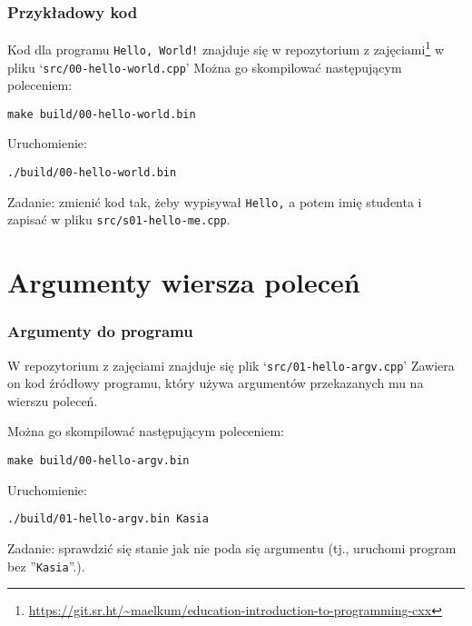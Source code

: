 \documentclass[aspectratio=169]{beamer}
\begin{document}
\begin{frame}
    \frametitle{Przykładowy kod}

    Kod dla programu {\tt Hello, World!} znajduje się w repozytorium z
    zajęciami\footnote{\url{https://git.sr.ht/~maelkum/education-introduction-to-programming-cxx}}
    w pliku `{\tt src/00-hello-world.cpp}'
    Można go skompilować następującym poleceniem:

    \vspace{1em}
    {\tt make build/00-hello-world.bin}
    \vspace{1em}

    Uruchomienie:

    \vspace{1em}
    {\tt ./build/00-hello-world.bin}
    \vspace{1em}

    Zadanie: zmienić kod tak, żeby wypisywał {\tt Hello,} a potem imię studenta
    i zapisać w pliku {\tt src/s01-hello-me.cpp}.
    \label{lecture_exercise_0}
\end{frame}

\section{Argumenty wiersza poleceń}

\begin{frame}
    \frametitle{Argumenty do programu}

    W repozytorium z zajęciami znajduje się plik `{\tt src/01-hello-argv.cpp}'
    Zawiera on kod źródłowy programu, który używa argumentów przekazanych mu na
    wierszu poleceń.

    Można go skompilować następującym poleceniem:

    \vspace{1em}
    {\tt make build/00-hello-argv.bin}
    \vspace{1em}

    Uruchomienie:

    \vspace{1em}
    {\tt ./build/01-hello-argv.bin Kasia}
    \vspace{1em}

    Zadanie: sprawdzić się stanie jak nie poda się argumentu (tj., uruchomi
    program bez ''{\tt Kasia}''.).
    \label{lecture_exercise_1}
\end{frame}
\end{document}

